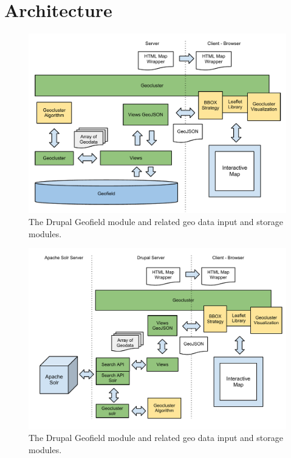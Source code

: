 
%
%

\section{Architecture}
\label{chapter:architecture}



\begin{figure}[h]
  \begin{center}
    \includegraphics[width=1\textwidth]{figures/geocluster_architecture.pdf}
    \caption{The Drupal Geofield module and related geo data input and storage modules.}
    \label{fig:geofield}
  \end{center}
\end{figure}



\begin{figure}[h]
  \begin{center}
    \includegraphics[width=1\textwidth]{figures/geocluster_solr_architecture.pdf}
    \caption{The Drupal Geofield module and related geo data input and storage modules.}
    \label{fig:geofield}
  \end{center}
\end{figure}